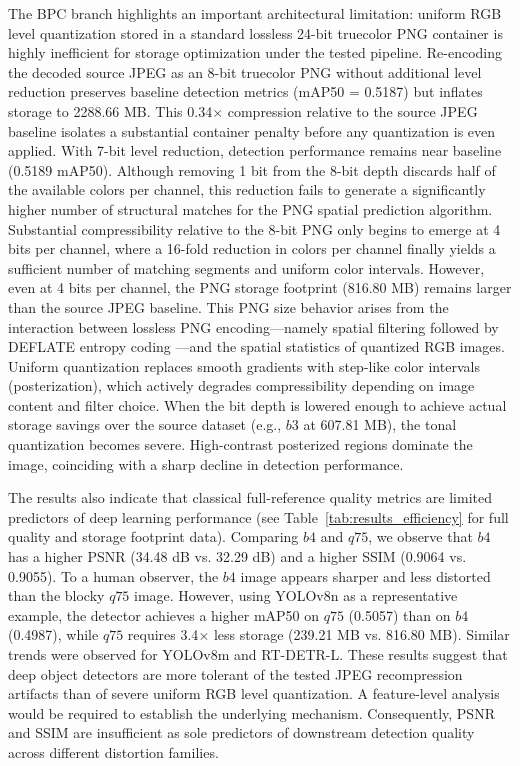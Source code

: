 \documentclass[12pt, a4paper]{article}
\begin{document}
The BPC branch highlights an important architectural limitation: uniform RGB level quantization stored in a standard lossless 24-bit truecolor PNG container is highly inefficient for storage optimization under the tested pipeline. Re-encoding the decoded source JPEG as an 8-bit truecolor PNG without additional level reduction preserves baseline detection metrics (mAP50 = 0.5187) but inflates storage to 2288.66 MB. This 0.34$\times$ compression relative to the source JPEG baseline isolates a substantial container penalty before any quantization is even applied. With 7-bit level reduction, detection performance remains near baseline (0.5189 mAP50). Although removing 1 bit from the 8-bit depth discards half of the available colors per channel, this reduction fails to generate a significantly higher number of structural matches for the PNG spatial prediction algorithm. Substantial compressibility relative to the 8-bit PNG only begins to emerge at 4 bits per channel, where a 16-fold reduction in colors per channel finally yields a sufficient number of matching segments and uniform color intervals. However, even at 4 bits per channel, the PNG storage footprint (816.80 MB) remains larger than the source JPEG baseline. This PNG size behavior arises from the interaction between lossless PNG encoding---namely spatial filtering followed by DEFLATE entropy coding \cite{w3c2003}---and the spatial statistics of quantized RGB images. Uniform quantization replaces smooth gradients with step-like color intervals (posterization), which actively degrades compressibility depending on image content and filter choice. When the bit depth is lowered enough to achieve actual storage savings over the source dataset (e.g., $b3$ at 607.81 MB), the tonal quantization becomes severe. High-contrast posterized regions dominate the image, coinciding with a sharp decline in detection performance.

The results also indicate that classical full-reference quality metrics are limited predictors of deep learning performance (see Table~\ref{tab:results_efficiency} for full quality and storage footprint data). Comparing $b4$ and $q75$, we observe that $b4$ has a higher PSNR (34.48 dB vs. 32.29 dB) and a higher SSIM (0.9064 vs. 0.9055). To a human observer, the $b4$ image appears sharper and less distorted than the blocky $q75$ image. However, using YOLOv8n as a representative example, the detector achieves a higher mAP50 on $q75$ (0.5057) than on $b4$ (0.4987), while $q75$ requires 3.4$\times$ less storage (239.21 MB vs. 816.80 MB). Similar trends were observed for YOLOv8m and RT-DETR-L. These results suggest that deep object detectors are more tolerant of the tested JPEG recompression artifacts than of severe uniform RGB level quantization. A feature-level analysis would be required to establish the underlying mechanism. Consequently, PSNR and SSIM are insufficient as sole predictors of downstream detection quality across different distortion families.
\end{document}
